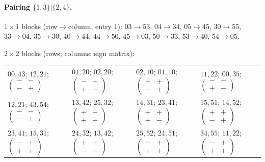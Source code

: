 \paragraph{Pairing $\{1,3\}|\{2,4\}$.}
$1\times1$ blocks (row$\to$column, entry $1$): $03\to53$, $04\to34$, $05\to45$, $30\to55$, $33\to04$, $35\to30$, $40\to44$, $44\to50$, $45\to03$, $50\to33$, $53\to40$, $54\to05$.

$2\times2$ blocks (rows; columns; sign matrix):
\begin{center}\small\begin{tabular}{llll}
$00,43$; $12,21$; $\left(\begin{smallmatrix}-&-\\-&+\end{smallmatrix}\right)$ & $01,20$; $02,20$; $\left(\begin{smallmatrix}-&+\\+&+\end{smallmatrix}\right)$ & $02,10$; $01,10$; $\left(\begin{smallmatrix}+&+\\-&+\end{smallmatrix}\right)$ & $11,22$; $00,35$; $\left(\begin{smallmatrix}-&-\\+&-\end{smallmatrix}\right)$ \\
$12,21$; $43,54$; $\left(\begin{smallmatrix}-&-\\-&+\end{smallmatrix}\right)$ & $13,42$; $25,32$; $\left(\begin{smallmatrix}+&-\\+&+\end{smallmatrix}\right)$ & $14,31$; $23,41$; $\left(\begin{smallmatrix}+&+\\+&-\end{smallmatrix}\right)$ & $15,51$; $14,52$; $\left(\begin{smallmatrix}+&+\\-&+\end{smallmatrix}\right)$ \\
$23,41$; $15,31$; $\left(\begin{smallmatrix}-&+\\+&+\end{smallmatrix}\right)$ & $24,32$; $13,42$; $\left(\begin{smallmatrix}+&+\\-&+\end{smallmatrix}\right)$ & $25,52$; $24,51$; $\left(\begin{smallmatrix}-&+\\+&+\end{smallmatrix}\right)$ & $34,55$; $11,22$; $\left(\begin{smallmatrix}-&+\\+&+\end{smallmatrix}\right)$ \\
\end{tabular}\end{center}

